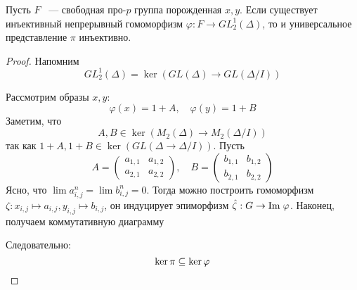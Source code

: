 \vskip 0.1in\noindent
\begin{theorem}[Зубков, 1987]
    Пусть $F$ ~--- свободная про-$p$ группа порожденная $x, y$.
    Если существует инъективный непрерывный гомоморфизм $\varphi: F \to GL^1_2(\Delta)$, то и универсальное представление $\pi$ инъективно.
\end{theorem}
\begin{proof}
    Напомним
    \[
        GL^1_2(\Delta) = \ker{(GL(\Delta)\to GL(\Delta/I))}
    \]

    Рассмотрим образы $x, y$:
    \[
        \varphi(x) = 1 + A, \quad
        \varphi(y) = 1 + B
    \]
    Заметим, что
    \[
        A, B \in \ker{(M_2(\Delta)\to M_2(\Delta/I))}
    \]
    так как $1 + A, 1 + B \in \ker{(GL(\Delta \to \Delta / I))}$.
    Пусть
    \[
        A=
        \begin{pmatrix}
            a_{1,1} & a_{1,2} \\
            a_{2,1} & a_{2,2}
        \end{pmatrix},
        \quad
        B=
        \begin{pmatrix}
            b_{1,1} & b_{1,2} \\
            b_{2,1} & b_{2,2}
        \end{pmatrix}
    \]
    Ясно, что $\lim a_{i,j}^n = \lim b_{i,j}^n = 0$.
    Тогда можно построить гомоморфизм $\zeta: x_{i,j} \mapsto a_{i,j}, y_{i,j} \mapsto b_{i,j}$, он индуцирует эпиморфизм
    $\hat{\zeta}: G \to \mathrm{Im}\hspace{0.1cm}{\varphi}$.
    Наконец, получаем коммутативную диаграмму
    \begin{center}
    \end{center}
    Следовательно:
    \[
        \ker{\pi} \subseteq \ker{\varphi} \qedhere
    \]

\end{proof}

